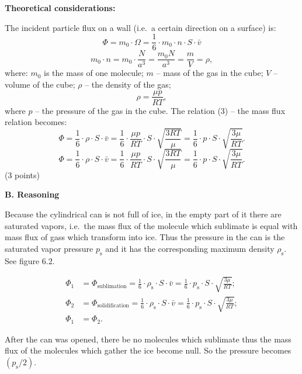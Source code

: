 \textbf{Theoretical considerations:}

The incident particle flux on a wall (i.e.\ a certain direction on a surface)
is:
\[ \Phi = m_0 \cdot \Omega
   = \frac{1}{6}\cdot m_0 \cdot n \cdot S \cdot \bar{v} \tag*{(3)} \]
\[ m_0 \cdot n = m_0 \cdot \frac{N}{a^3} = \frac{m_0 N}{a^3}
   = \frac{m}{V} = \rho, \]
where: $m_0$ is the mass of one molecule; $m$ -- mass of the gas in the cube;
$V$ -- volume of the cube; $\rho$ -- the density of the gas;
\[ \rho = \frac{\mu p}{RT}, \]
where $p$ -- the pressure of the gas in the cube. The relation (3) -- the mass
flux relation becomes:
\[ \Phi = \frac{1}{6}\cdot\rho\cdot S\cdot\bar{v}
   = \frac{1}{6}\cdot\frac{\mu p}{RT}\cdot S\cdot\sqrt{\frac{3RT}{\mu}}
   = \frac{1}{6}\cdot p\cdot S\cdot\sqrt{\frac{3\mu}{RT}}. \tag*{(4)} \]
\[ \Phi = \frac{1}{6}\cdot\rho\cdot S\cdot\bar{v}
   = \frac{1}{6}\cdot\frac{\mu p}{RT}\cdot S\cdot\sqrt{\frac{3RT}{\mu}}
   = \frac{1}{6}\cdot p\cdot S\cdot\sqrt{\frac{3\mu}{RT}}. \tag*{(5)} \]
\hfill(3 points)

\textbf{B. Reasoning}

Because the cylindrical can is not full of ice, in the empty part of it there
are saturated vapors, i.e.\ the mass flux of the molecule which sublimate is
equal with mass flux of gass %
which transform into ice. Thus the pressure in the can is the saturated vapor
pressure $p_{\mathrm{s}}$ and it has the corresponding maximum density
$\rho_{\mathrm{s}}$. See figure 6.2.

\begin{align*}
  \Phi_1 &= \Phi_{\mathrm{sublimation}}
    = \frac{1}{6}\cdot\rho_{\mathrm{s}}\cdot S\cdot\bar{v}
    = \frac{1}{6}\cdot p_{\mathrm{s}}\cdot S\cdot\sqrt{\frac{3\mu}{RT}}; \\
  \Phi_2 &= \Phi_{\mathrm{solidification}}
    = \frac{1}{6}\cdot\rho_{\mathrm{s}}\cdot S\cdot\bar{v}
    = \frac{1}{6}\cdot p_{\mathrm{s}}\cdot S\cdot\sqrt{\frac{3\mu}{RT}}; \\
  \Phi_1 &= \Phi_2.
\end{align*}

After the can was opened, there be no molecules which sublimate thus the mass
flux of the molecules which gather the ice become null. So the pressure
becomes $\left(p_{\mathrm{s}}/2\right)$.

